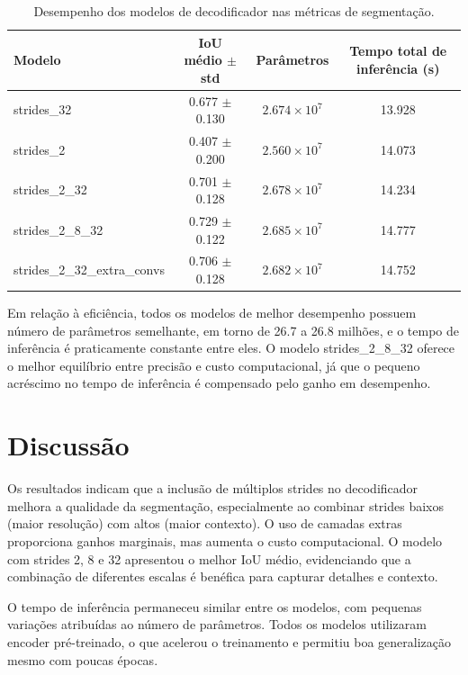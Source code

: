 \documentclass[%
 reprint,
 amsmath,amssymb,
 aps,
]{revtex4-2}
\begin{document}
\begin{table}[b]
\caption{\label{tab:performance}
Desempenho dos modelos de decodificador nas métricas de segmentação.}
\begin{ruledtabular}
\begin{tabular}{lccc}
\hline
Modelo & IoU médio $\pm$ std & Parâmetros & Tempo total de inferência (s) \\
\hline
strides\_32              & 0.677 $\pm$ 0.130 & $2.674 \times 10^{7}$ & 13.928 \\
strides\_2               & 0.407 $\pm$ 0.200 & $2.560 \times 10^{7}$ & 14.073 \\
strides\_2\_32           & 0.701 $\pm$ 0.128 & $2.678 \times 10^{7}$ & 14.234 \\
strides\_2\_8\_32        & 0.729 $\pm$ 0.122 & $2.685 \times 10^{7}$ & 14.777 \\
strides\_2\_32\_extra\_convs & 0.706 $\pm$ 0.128 & $2.682 \times 10^{7}$ & 14.752 \\
\hline
\end{tabular}
\end{ruledtabular}
\end{table}

Em relação à eficiência, todos os modelos de melhor desempenho possuem número de parâmetros semelhante, em torno de 26.7 a 26.8 milhões, e o tempo de inferência é praticamente constante entre eles. O modelo strides\_2\_8\_32 oferece o melhor equilíbrio entre precisão e custo computacional, já que o pequeno acréscimo no tempo de inferência é compensado pelo ganho em desempenho.

\section{Discussão}

Os resultados indicam que a inclusão de múltiplos strides no decodificador melhora a qualidade da segmentação, especialmente ao combinar strides baixos (maior resolução) com altos (maior contexto). O uso de camadas extras proporciona ganhos marginais, mas aumenta o custo computacional. O modelo com strides 2, 8 e 32 apresentou o melhor IoU médio, evidenciando que a combinação de diferentes escalas é benéfica para capturar detalhes e contexto.

O tempo de inferência permaneceu similar entre os modelos, com pequenas variações atribuídas ao número de parâmetros. Todos os modelos utilizaram encoder pré-treinado, o que acelerou o treinamento e permitiu boa generalização mesmo com poucas épocas.
\end{document}
